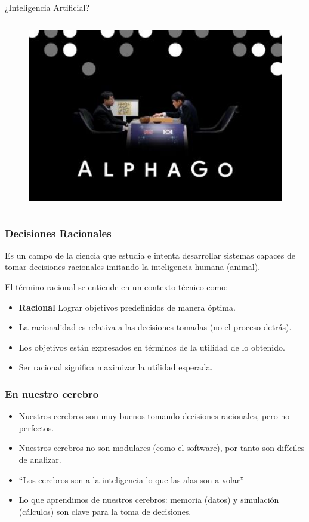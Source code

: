 \documentclass[10pt]{beamer}
\begin{document}
\begin{frame}{¿Inteligencia Artificial?}
\begin{columns}
\begin{column}{0.32\textwidth}
\begin{figure}[!h]
                \centering
                \includegraphics[width=1\textwidth]{img/alphago}
            \end{figure}                
        \end{column}
    \end{columns}
    
\end{frame}

\begin{frame}
    \frametitle{Decisiones Racionales}
    Es un campo de la ciencia que estudia e intenta desarrollar sistemas 
    capaces de tomar decisiones racionales imitando la inteligencia humana (animal).

    El término \alert{racional} se entiende en un contexto técnico como:
    \begin{itemize}
        \item \textbf{Racional} Lograr objetivos predefinidos de manera óptima.
        \item La racionalidad es relativa a las decisiones tomadas (no el proceso detrás).
        \item Los objetivos están expresados en términos de la \alert{utilidad} de lo obtenido.
        \pause
        \item Ser \alert{racional} significa \alert{maximizar la utilidad esperada}.
    \end{itemize}
\end{frame}

\begin{frame}
    \frametitle{En nuestro cerebro}
    \begin{itemize}
        \item Nuestros cerebros son muy buenos tomando decisiones racionales, \alert{pero no perfectos}.
        \item Nuestros cerebros no son modulares (como el software), por tanto son difíciles de analizar.
        \item ``Los cerebros son a la inteligencia lo que las alas son a volar''
        \item Lo que aprendimos de nuestros cerebros: memoria (datos) y simulación (cálculos) son 
        clave para la toma de decisiones.
    \end{itemize}
\end{frame}
\end{document}
